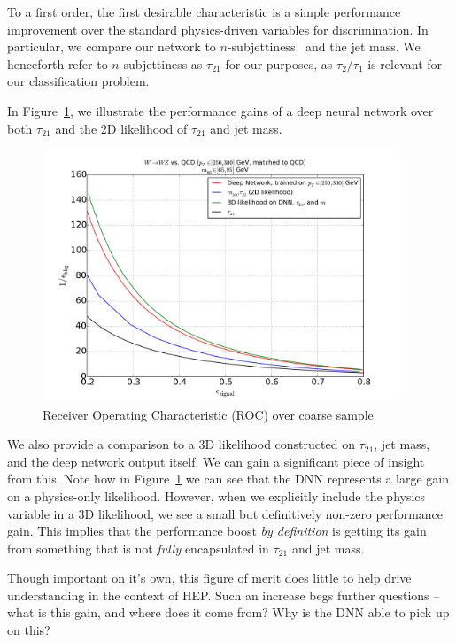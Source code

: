 \documentclass{article}
\begin{document}
To a first order, the first desirable characteristic is a simple performance improvement over the standard physics-driven variables for discrimination. In particular, we compare our network to $n$-subjettiness~\cite{nsub} and the jet mass. We henceforth refer to $n$-subjettiness as $\tau_{21}$ for our purposes, as $\tau_{2}/\tau_{1}$ is relevant for our classification problem.

In Figure~\ref{fig:combinedROC}, we illustrate the performance gains of a deep neural network over both $\tau_{21}$ and the 2D likelihood of $\tau_{21}$ and jet mass. 


\begin{figure}[!htbp]
  \centering
  \includegraphics[width=0.95\textwidth]{figures/combined-roc.pdf}
  \caption{Receiver Operating Characteristic (ROC) over coarse sample}
  \label{fig:combinedROC}
\end{figure}

We also provide a comparison to a 3D likelihood constructed on $\tau_{21}$, jet mass, and the deep network output itself. We can gain a significant piece of insight from this. Note how in Figure~\ref{fig:combinedROC} we can see that the DNN represents a large gain on a physics-only likelihood. However, when we explicitly include the physics variable in a 3D likelihood, we see a small but definitively non-zero performance gain. This implies that the performance boost \emph{by definition} is getting its gain from something that is not \emph{fully} encapsulated in $\tau_{21}$ and jet mass. 

Though important on it's own, this figure of merit does little to help drive understanding in the context of HEP. Such an increase begs further questions -- what is this gain, and where does it come from? Why is the DNN able to pick up on this?
\end{document}
